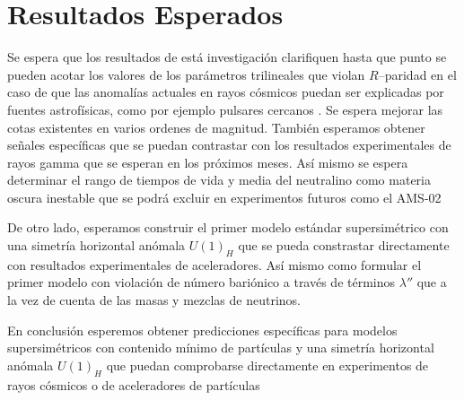 \section{ Resultados Esperados }

Se espera que los resultados de está investigación clarifiquen hasta que punto se pueden acotar los valores de los parámetros trilineales que violan $R$--paridad en el caso de que las anomalías actuales en rayos cósmicos puedan ser explicadas por fuentes astrofísicas, como por ejemplo pulsares cercanos \cite[y referencias internas]{Chowdhury:2009jd}. Se espera mejorar las cotas existentes \cite{Barbieri:1988mw,Berezinsky:1991sp,Diwan:1996gw,Berezinsky:1996pb,Baltz:1997ar,Gupta:2004dz,Huber:2005iz} en varios ordenes de magnitud. También esperamos obtener señales específicas que se puedan contrastar con los resultados experimentales de rayos gamma que se esperan en los próximos meses.
Así mismo se espera determinar el rango de tiempos de vida y media del neutralino como materia oscura inestable que se podrá excluir en experimentos futuros como el AMS-02 \cite{ams:2009}

De otro lado, esperamos construir el primer modelo estándar supersimétrico con una simetría horizontal anómala $U(1)_H$ que se pueda constrastar directamente con resultados experimentales de aceleradores. Así mismo como formular el primer modelo con violación de número bariónico a través de términos $\lambda''$ que a la vez de cuenta de las masas y mezclas de neutrinos.

En conclusión esperemos obtener predicciones específicas para modelos supersimétricos con contenido mínimo de partículas y una simetría horizontal anómala $U(1)_H$ que puedan comprobarse directamente en experimentos de rayos cósmicos o de aceleradores de partículas


